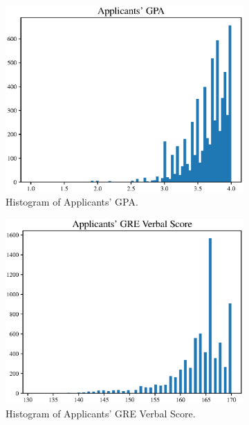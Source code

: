 \documentclass{article}
\begin{document}
\begin{figure}[h]
    \centering
    \begin{subfigure}{.5\linewidth}\centering
	\includegraphics[width=\textwidth]{gpa.eps}
	\caption{Histogram of Applicants' GPA.}
    \end{subfigure}%
    \begin{subfigure}{.5\linewidth}\centering
	\includegraphics[width=\textwidth]{gre.eps}
	\caption{Histogram of Applicants' GRE Verbal Score.}
    \end{subfigure}
    \begin{subfigure}{.5\linewidth}\centering

\end{subfigure}
\end{figure}
\end{document}
